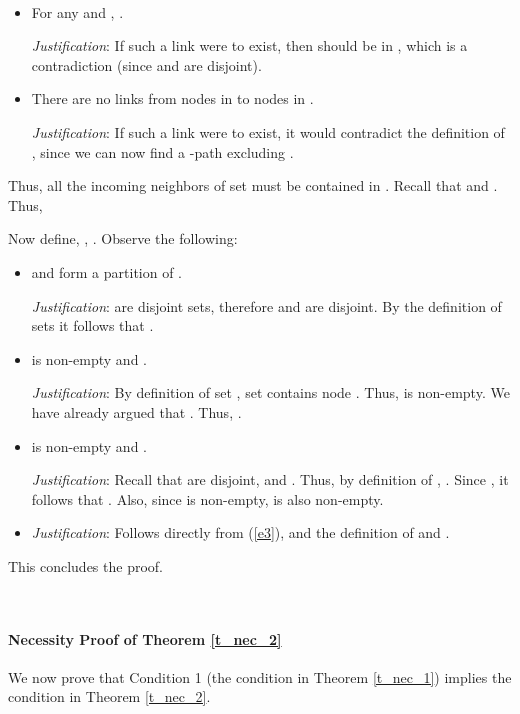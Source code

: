 \documentclass[letterpaper, 11pt]{article}
\newenvironment{proof}{\noindent {\bf Proof:}~}{\hspace*{\fill}}
\begin{document}
\begin{proof}
\begin{itemize}
\item For any  and , .

{\em Justification}: If such a link were to exist, then
	 should be in , which is a contradiction
	(since  and  are disjoint).

\item There are no links from nodes in  to nodes in .

{\em Justification}: If such a link were to exist,
	it would contradict the definition of , since we
	can now find a -path excluding .
\end{itemize}
Thus, all the incoming neighbors of set  must be contained in
. Recall that  and . Thus, 

Now define, ,  .
Observe the following:
\begin{itemize}
\item  and  form a partition of .

{\em Justification}:
 are disjoint sets, therefore  and
 are disjoint. By the definition of
sets  it follows that
.

\item  is non-empty and .

{\em Justification}:
By definition of set , set  contains node .
Thus,  is non-empty. We have already argued that .
Thus, .



\item  is non-empty and .

{\em Justification}:
Recall that  are disjoint,
and . Thus, by definition of ,
. Since , it follows that
.
Also, since  is non-empty,  is also non-empty.

\item 

{\em Justification}: Follows directly from (\ref{e3}),
and the definition of  and . 
\end{itemize}
This concludes the proof.
\end{proof}

~



\paragraph{Necessity Proof of Theorem \ref{t_nec_2}}

We now prove that Condition 1 (the condition in Theorem \ref{t_nec_1}) implies the condition in Theorem \ref{t_nec_2}.
\end{document}
